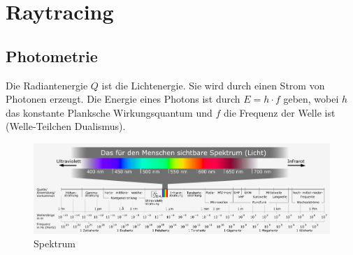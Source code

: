 \section{Raytracing}
 
\begin{figure}[H]\centering
    \hspace*{0.1\textwidth}
   \end{figure}


\begin{figure}[H]\centering
    \hspace*{0.1\textwidth}
   \end{figure}




\subsection{Photometrie}

Die Radiantenergie $Q$ ist die Lichtenergie. Sie wird durch einen Strom von Photonen erzeugt. Die Energie eines Photons ist 
durch $E=h \cdot f$ geben, wobei $h$ das konstante Planksche Wirkungsquantum und $f$ die Frequenz der Welle ist (Welle-Teilchen Dualismus).  

 \begin{figure}[H]
    \centering
    \includegraphics[width=1.0\textwidth]{images/Electromagnetic_spectrum_c.png}
    \caption{Spektrum}
    \label{fig:cray}
\end{figure}


